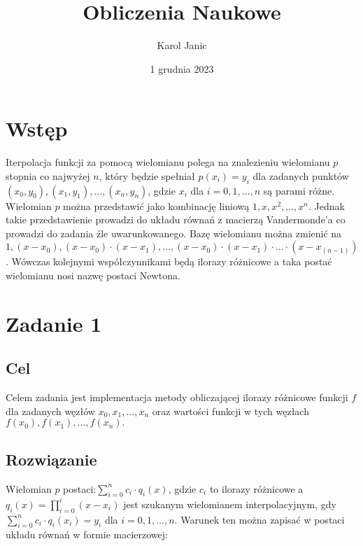 \documentclass{article}
\title{Obliczenia Naukowe}
\author{Karol Janic}
\date{1 grudnia 2023}
\begin{document}
\begin{titlingpage}
    \maketitle
\end{titlingpage}

\tableofcontents

\newpage

\section{Wstęp}
Iterpolacja funkcji za pomocą wielomianu polega na znalezieniu wielomianu $p$ stopnia co najwyżej $n$, 
który będzie spełniał $p(x_i) = y_i$ dla zadanych punktów $(x_0, y_0), (x_1, y_1), \ldots, (x_n, y_n)$, 
gdzie $x_i$ dla $i=0, 1, \ldots, n$ są parami różne. Wielomian $p$ można przedstawić jako kombinację liniową 
$1, x, x^2, \ldots, x^n$. Jednak takie przedstawienie prowadzi do układu równań z macierzą Vandermonde'a 
co prowadzi do zadania źle uwarunkowanego. Bazę wielomianu można zmienić na $1, (x-x_0), (x-x_0) \cdot (x-x_1), \ldots, (x-x_0) \cdot (x-x_1) \cdot \ldots \cdot (x-x_(n-1))$.
Wówczas kolejnymi współczynnikami będą ilorazy różnicowe a taka postać wielomianu nosi nazwę postaci Newtona.

\section{Zadanie 1}
\subsection{Cel}
Celem zadania jest implementacja metody obliczającej ilorazy różnicowe funkcji $f$ dla zadanych węzłów $x_0, x_1, \ldots, x_n$
oraz wartości funkcji w tych węzłach $f(x_0), f(x_1), \ldots, f(x_n).$

\subsection{Rozwiązanie}
Wielomian $p$ postaci:$ \sum_{i=0}^{n} c_i \cdot q_i(x) $, gdzie $c_i$ to ilorazy różnicowe a $q_i(x) = \prod_{i=0}^{i} (x-x_i)$ jest szukanym wielomianem interpolacyjnym, 
gdy $ \sum_{i=0}^{n} c_i \cdot q_i(x_i) = y_i$ dla $i=0, 1, \ldots, n$. Warunek ten można zapisać w postaci układu równań w formie macierzowej:
\end{document}
